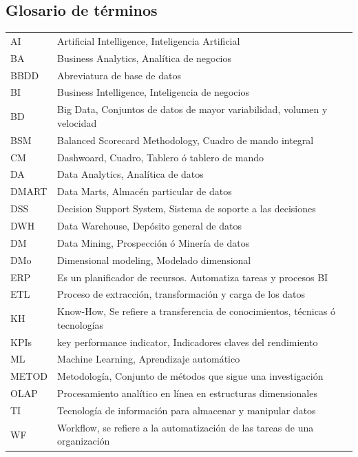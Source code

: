 \documentclass[12pt,jou]{apa7}
\begin{document}
\subsection{Glosario de términos}
\begin{table}[h]
\begin{tabular}{ll} 
AI\label{AI} & Artificial Intelligence, Inteligencia Artificial\\
BA\label{BA} & 	Business Analytics, Analítica de negocios\\
BBDD\label{BaseD} & Abreviatura de base de datos\\
BI\label{BI} & 	Business Intelligence, Inteligencia de negocios\\
BD\label{BD}  & Big Data, Conjuntos de datos de mayor variabilidad, volumen y velocidad\\
BSM\label{BSM} & Balanced Scorecard Methodology, Cuadro de mando integral\\
CM\label{DW}  & Dashwoard, Cuadro, Tablero ó tablero de mando\\
DA\label{DA}  & Data Analytics, Analítica de datos\\
DMART\label{DMart} & Data Marts, Almacén particular de datos\\
DSS\label{DSS}& Decision Support System, Sistema de soporte a las decisiones\\
DWH\label{DWH}  & Data Warehouse, Depósito general de datos\\
DM\label{DM}  & Data Mining, Prospección ó Minería de datos\\
DMo\label{DMo}  & Dimensional modeling, Modelado dimensional\\
ERP\label{ERP}  & Es un planificador de recursos. Automatiza tareas y procesos BI\\
ETL\label{ETL}  & Proceso de extracción, transformación y carga de los datos\\
KH\label{KH} & Know-How,  Se refiere a transferencia de conocimientos, técnicas ó tecnologías\\
KPIs\label{KPI} &  key performance indicator, Indicadores claves del rendimiento\\
ML\label{ML} & Machine Learning, Aprendizaje automático\\
METOD\label{MET} &  Metodología, Conjunto de métodos que sigue una investigación\\
OLAP\label{OLAP} &  Procesamiento analítico en línea en estructuras dimensionales\\
TI\label{TI}  &   Tecnología de información para almacenar y manipular datos\\
WF\label{WF} & Workflow, se refiere a la automatización de las tareas de una organización
\end{tabular} \label{glosario}
\end{table}
\end{document}
